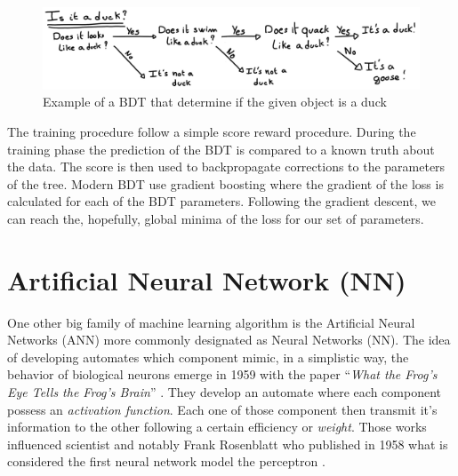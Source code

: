 \begin{figure}
  \centering
  \includegraphics[width=\linewidth]{images/ml/Bdt.jpg}
  \caption{Example of a BDT that determine if the given object is a duck}
  \label{fig:ml:bdt}
\end{figure}

The training procedure follow a simple score reward procedure. During the training phase the prediction of the BDT is compared to a known truth about the data. The score is then used to backpropagate corrections to the parameters of the tree. Modern BDT use gradient boosting where the gradient of the loss is calculated for each of the BDT parameters. Following the gradient descent, we can reach the, hopefully, global minima of the loss for our set of parameters.

\section{Artificial Neural Network (NN)}

One other big family of machine learning algorithm is the Artificial Neural Networks (ANN) more commonly designated as Neural Networks (NN). The idea of developing automates which component mimic, in a simplistic way, the behavior of biological neurons emerge in 1959 with the paper ``\textit{What the Frog's Eye Tells the Frog's Brain}'' \cite{lettvin_what_1959}. They develop an automate where each component possess an \textit{activation function}. Each one of those component then transmit it's information to the other following a certain efficiency or \textit{weight}.
Those works influenced scientist and notably Frank Rosenblatt who published in 1958 what is considered the first neural network model the perceptron \cite{rosenblatt_perceptron_1958}.


